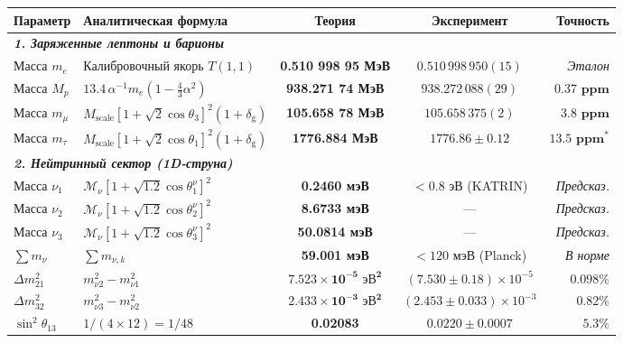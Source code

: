\documentclass[12pt,a4paper]{article}
\begin{document}
	\begin{table}[h!]
		\centering
		\footnotesize %
		\renewcommand{\arraystretch}{1.2} %
		\begin{tabularx}{\textwidth}{l p{4.2cm} c c r}
			\toprule
			\textbf{Параметр} & \textbf{Аналитическая формула} & \textbf{Теория} & \textbf{Эксперимент} & \textbf{Точность} \\
			\midrule
			\multicolumn{5}{l}{\textit{\textbf{1. Заряженные лептоны и барионы}}} \\
			Масса $m_e$ & Калибровочный якорь $T(1,1)$ & \textbf{0.510 998 95 МэВ} & $0.510\,998\,950(15)$ & \textit{Эталон} \\
			Масса $M_p$ & $13.4 \, \alpha^{-1} m_e (1 - \frac{4}{3}\alpha^2)$ & \textbf{938.271 74 МэВ} & $938.272\,088(29)$ & $\mathbf{0.37 \text{ ppm}}$ \\
			Масса $m_\mu$ & $M_{\text{scale}} [1+\sqrt{2}\cos\theta_3]^2 (1+\delta_{\text{g}})$ & \textbf{105.658 78 МэВ} & $105.658\,375(2)$ & $\mathbf{3.8 \text{ ppm}}$ \\
			Масса $m_\tau$ & $M_{\text{scale}} [1+\sqrt{2}\cos\theta_1]^2 (1+\delta_{\text{g}})$ & \textbf{1776.884 МэВ} & $1776.86 \pm 0.12$ & $\mathbf{13.5 \text{ ppm}}^*$ \\
			\midrule
			\multicolumn{5}{l}{\textit{\textbf{2. Нейтринный сектор (1D-струна)}}} \\
			Масса $\nu_1$ & $\mathcal{M}_\nu [1 + \sqrt{1.2}\cos\theta_1^\nu]^2$ & \textbf{0.2460 мэВ} & $< 0.8$ эВ (KATRIN) & \textit{Предсказ.} \\
			Масса $\nu_2$ & $\mathcal{M}_\nu [1 + \sqrt{1.2}\cos\theta_2^\nu]^2$ & \textbf{8.6733 мэВ} & --- & \textit{Предсказ.} \\
			Масса $\nu_3$ & $\mathcal{M}_\nu [1 + \sqrt{1.2}\cos\theta_3^\nu]^2$ & \textbf{50.0814 мэВ} & --- & \textit{Предсказ.} \\
			$\sum m_\nu$ & $\sum m_{\nu, k}$ & \textbf{59.001 мэВ} & $< 120$ мэВ (Planck) & \textit{В норме} \\
			$\Delta m_{21}^2$ & $m_{\nu 2}^2 - m_{\nu 1}^2$ & $\mathbf{7.523 \times 10^{-5} \text{ эВ}^2}$ & $(7.530 \pm 0.18) \times 10^{-5}$ & $\mathbf{0.098\%}$ \\
			$\Delta m_{32}^2$ & $m_{\nu 3}^2 - m_{\nu 2}^2$ & $\mathbf{2.433 \times 10^{-3} \text{ эВ}^2}$ & $(2.453 \pm 0.033) \times 10^{-3}$ & $\mathbf{0.82\%}$ \\
			$\sin^2\theta_{13}$ & $1 / (4 \times 12) = 1/48$ & \textbf{0.02083} & $0.0220 \pm 0.0007$ & $\mathbf{5.3\%}$ \\

\end{tabularx}
\end{table}
\end{document}
